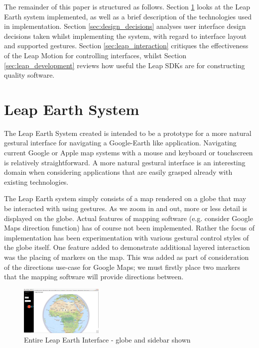 \documentclass{sigplanconf}
\begin{document}
The remainder of this paper is structured as follows. Section \ref{sec:leap_system} looks at the Leap Earth system implemented, as well as a brief description of the technologies used in implementation. Section \ref{sec:design_decisions} analyses user interface design decisions taken whilst implementing the system, with regard to interface layout and supported gestures. Section \ref{sec:leap_interaction} critiques the effectiveness of the Leap Motion for controlling interfaces, whilst Section \ref{sec:leap_development} reviews how useful the Leap SDKs are for constructing quality software.

\section{Leap Earth System}
\label{sec:leap_system}

The Leap Earth System created is intended to be a prototype for a more natural gestural interface for navigating a Google-Earth like application. Navigating current Google or Apple map systems with a mouse and keyboard or touchscreen is relatively straightforward. A more natural gestural interface is an interesting domain when considering applications that are easily grasped already with existing technologies. 

The Leap Earth system simply consists of a map rendered on a globe that may be interacted with using gestures. As we zoom in and out, more or less detail is displayed on the globe. Actual features of mapping software (e.g. consider Google Maps direction function) has of course not been implemented. Rather the focus of implementation has been experimentation with various gestural control styles of the globe itself. One feature added to demonstrate additional layered interaction was the placing of markers on the map. This was added as part of consideration of the directions use-case for Google Maps; we must firstly place two markers that the mapping software will provide directions between. 

\begin{center}
\begin{figure}[h!]
\centering
\includegraphics[width=150px]{images/entire_interface.png}
\caption{Entire Leap Earth Interface - globe and sidebar shown}
\label{fig:halo_comparison}
\vspace{-10pt}
\end{figure}
\end{center}
\end{document}
